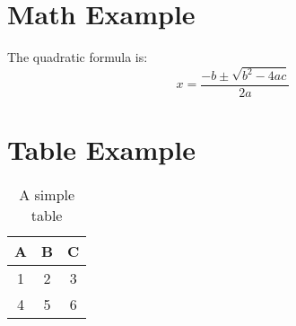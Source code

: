 \documentclass{article}
\begin{document}
\section{Math Example}
The quadratic formula is:
\[
  x = \frac{-b \pm \sqrt{b^2 - 4ac}}{2a}
\]

\section{Table Example}
\begin{table}[h]
\centering
\begin{tabular}{|c|c|c|}
\hline
A & B & C \\
\hline
1 & 2 & 3 \\
4 & 5 & 6 \\
\hline
\end{tabular}
\caption{A simple table}
\end{table}
\end{document}

